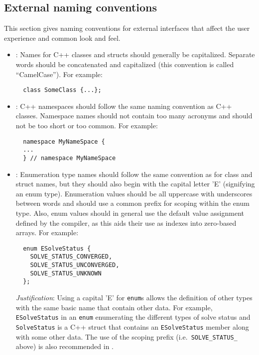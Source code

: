 %
\subsection{External naming conventions}
\label{sec:ExternalNamingConventions}
%

This section gives naming conventions for external interfaces that
affect the user experience and common look and feel.

\begin{itemize}

{}\item\NCClassNames: Names for C++ classes and structs should
generally be capitalized.  Separate words should be concatenated and
capitalized (this convention is called ``CamelCase'').  For example:

{\small\begin{verbatim}
  class SomeClass {...};
\end{verbatim}}


{}\item\NCNamespaceNames: C++ namespaces should follow the same naming
convention as C++ classes.  Namespace names should not contain too many
acronyms and should not be too short or too common.  For example:

{\small\begin{verbatim}
  namespace MyNameSpace {
  ...
  } // namespace MyNameSpace 
\end{verbatim}}


{}\item\NCEnumNames: Enumeration type names should follow the same
convention as for class and struct names, but they should also begin
with the capital letter 'E' (signifying an enum type).  Enumeration
values should be all uppercase with underscores between words and
should use a common prefix for scoping within the enum type.  Also,
enum values should in general use the default value assignment defined
by the compiler, as this aids their use as indexes into zero-based
arrays.  For example:

{\small\begin{verbatim}
  enum ESolveStatus {
    SOLVE_STATUS_CONVERGED,
    SOLVE_STATUS_UNCONVERGED,
    SOLVE_STATUS_UNKNOWN
  };
\end{verbatim}}


{}\textit{Justification}: Using a capital 'E' for {}\texttt{enum}s allows the
definition of other types with the same basic name that contain other data.
For example, {}\texttt{ESolveStatus} in an {}\texttt{enum} enumerating the
different types of solve status and {}\texttt{SolveStatus} is a C++ struct
that contains an {}\texttt{ESolveStatus} member along with some other data.
The use of the scoping prefix (i.e.\ {}\texttt{SOLVE\-\_STATUS\_} above) is
also recommended in {}\cite[Section 11.4]{CodeComplete2nd04}.



\end{itemize}
